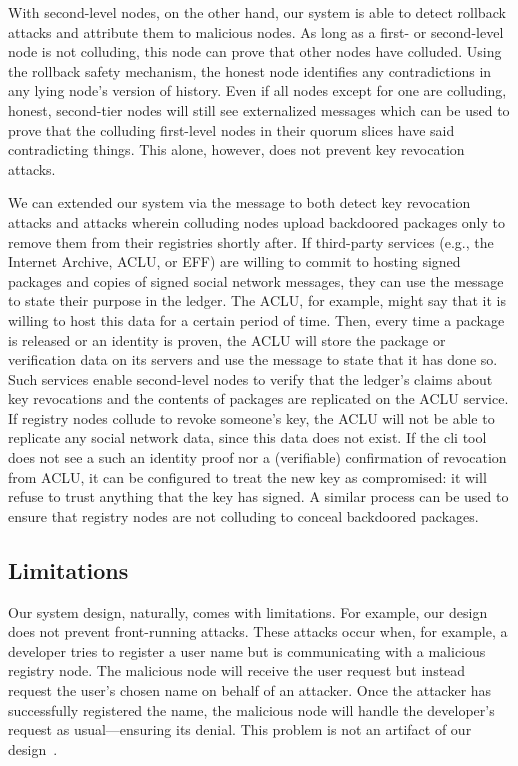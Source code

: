 With second-level nodes, on the other hand, our system is able to detect
rollback attacks and attribute them to malicious nodes. As long as a first- or
second-level node is not colluding, this node can prove that other nodes have
colluded. Using the rollback safety mechanism, the honest node identifies any
contradictions in any lying node's version of history. Even if all nodes except
for one are colluding, honest, second-tier nodes will still see externalized
messages which can be used to prove that the colluding first-level nodes in
their quorum slices have said contradicting things. This alone, however, does
not prevent key revocation attacks.

We can extended our system via the \extensible message to both detect key
revocation attacks and attacks wherein colluding nodes upload backdoored
packages only to remove them from their registries shortly after. If
third-party services (e.g., the Internet Archive, ACLU, or EFF) are willing to
commit to hosting signed packages and copies of signed social network messages,
they can use the \extensible message to state their purpose in the ledger. The
ACLU, for example, might say that it is willing to host this data for a certain
period of time. Then, every time a package is released or an identity is
proven, the ACLU will store the package or verification data on its servers and
use the \extensible message to state that it has done so. Such services enable
second-level nodes to verify that the ledger's claims about key revocations and
the contents of packages are replicated on the ACLU service. If registry nodes
collude to revoke someone's key, the ACLU will not be able to replicate any
social network data, since this data does not exist. If the \spam{} cli tool
does not see a such an identity proof nor a (verifiable) confirmation of
revocation from ACLU, it can be configured to treat the new key as compromised:
it will refuse to trust anything that the key has signed. A similar process can
be used to ensure that registry nodes are not colluding to conceal backdoored
packages. 

\subsection{Limitations}
Our system design, naturally, comes with limitations.
%
For example, our design does not prevent front-running attacks. These attacks
occur when, for example, a developer tries to register a user name but is
communicating with a malicious registry node. The malicious node will receive
the user request but instead request the user's chosen name on behalf of an
attacker. Once the attacker has successfully registered the name, the malicious
node will handle the developer's request as usual---ensuring its denial. This
problem is not an artifact of our design~\cite{frontrunning}.

